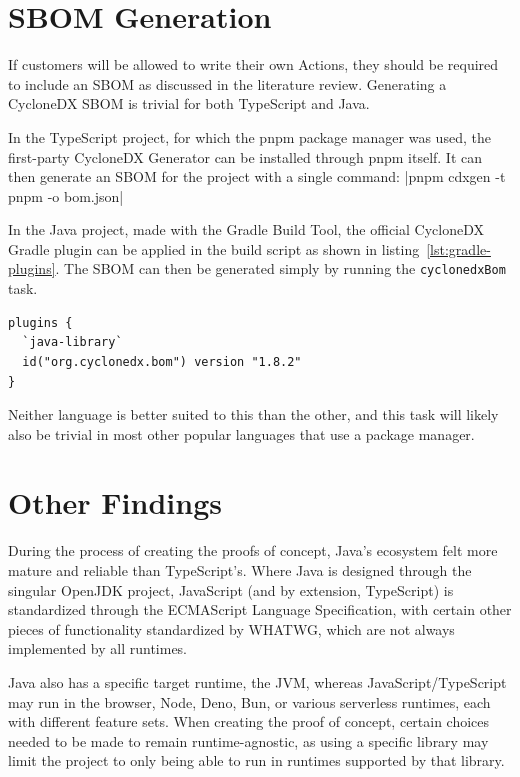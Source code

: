\section{SBOM Generation}
If customers will be allowed to write their own Actions, they should be required to include an SBOM as discussed in the literature review. Generating a CycloneDX SBOM is trivial for both TypeScript and Java.

In the TypeScript project, for which the pnpm package manager was used, the first-party CycloneDX Generator can be installed through pnpm itself. It can then generate an SBOM for the project with a single command:
|pnpm cdxgen -t pnpm -o bom.json|

In the Java project, made with the Gradle Build Tool, the official CycloneDX Gradle plugin can be applied in the build script as shown in listing~\ref{lst:gradle-plugins}. The SBOM can then be generated simply by running the \texttt{cyclonedxBom} task.
\begin{listing}[H]
\begin{verbatim}
plugins {
  `java-library`
  id("org.cyclonedx.bom") version "1.8.2"
}
\end{verbatim}
\caption{\label{lst:gradle-plugins}Plugin configuration in Gradle build script}
\end{listing}
Neither language is better suited to this than the other, and this task will likely also be trivial in most other popular languages that use a package manager.

\section{Other Findings}
During the process of creating the proofs of concept, Java's ecosystem felt more mature and reliable than TypeScript’s. Where Java is designed through the singular OpenJDK project, JavaScript (and by extension, TypeScript) is standardized through the ECMAScript Language Specification, with certain other pieces of functionality standardized by WHATWG, which are not always implemented by all runtimes. 

Java also has a specific target runtime, the JVM, whereas JavaScript/TypeScript may run in the browser, Node, Deno, Bun, or various serverless runtimes, each with different feature sets. When creating the proof of concept, certain choices needed to be made to remain runtime-agnostic, as using a specific library may limit the project to only being able to run in runtimes supported by that library.

